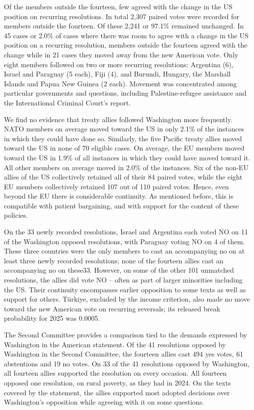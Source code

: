 \documentclass[12pt,authoryear]{elsarticle}
\begin{document}
Of the members outside the fourteen, few agreed with the change in the US position on recurring resolutions. In total 2,307 paired votes were recorded for members outside the fourteen. Of these 2,241 or 97.1\% remained unchanged. In 45 cases or 2.0\% of cases where there was room to agree with a change in the US position on a recurring resolution, members outside the fourteen agreed with the change while in 21 cases they moved away from the new American vote. Only eight members followed on two or more recurring resolutions: Argentina (6), Israel and Paraguay (5 each), Fiji (4), and Burundi, Hungary, the Marshall Islands and Papua New Guinea (2 each). Movement was concentrated among particular governments and questions, including Palestine-refugee assistance and the International Criminal Court's report.

We find no evidence that treaty allies followed Washington more frequently. NATO members on average moved toward the US in only 2.1\% of the instances in which they could have done so. Similarly, the five Pacific treaty allies moved toward the US in none of 70 eligible cases. On average, the EU members moved toward the US in 1.9\% of all instances in which they could have moved toward it. All other members on average moved in 2.0\% of the instances. Six of the non-EU allies of the US collectively retained all of their 84 paired votes, while the eight EU members collectively retained 107 out of 110 paired votes. Hence, even beyond the EU there is considerable continuity. As mentioned before, this is compatible with patient bargaining, and with support for the content of these policies.

On the 33 newly recorded resolutions, Israel and Argentina each voted NO on 11 of the Washington opposed resolutions, with Paraguay voting NO on 4 of them. These three countries were the only members to cast an accompanying no on at least three newly recorded resolutions; none of the fourteen allies cast an accompanying no on these33. However, on some of the other 101 unmatched resolutions, the allies did vote NO -- often as part of larger minorities including the US. Their continuity encompasses earlier opposition to some texts as well as support for others. Türkiye, excluded by the income criterion, also made no move toward the new American vote on recurring reversals; its released break probability for 2025 was 0.0005.

The Second Committee provides a comparison tied to the demands expressed by Washington in the American statement. Of the 41 resolutions opposed by Washington in the Second Committee, the fourteen allies cast 494 yes votes, 61 abstentions and 19 no votes. On 33 of the 41 resolutions opposed by Washington, all fourteen allies supported the resolution on every occasion. All fourteen opposed one resolution, on rural poverty, as they had in 2024. On the texts covered by the statement, the allies supported most adopted decisions over Washington's opposition while agreeing with it on some questions.
\end{document}
